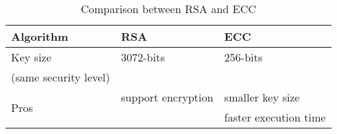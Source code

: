 \begin{table}[h]
     \centering
     \caption[Comparison between RSA and ECC]{Comparison between RSA and ECC}
     \label{table:rsa-ecc}
     \begin{tabular}{lll}
     \toprule[1.1pt]
                   Algorithm   & RSA   & ECC\\
     \midrule[1.1pt]
     \multirow{1}{*}{Key size} & 3072-bits  & 256-bits\\
                 (same security level) & & \\
     \midrule
     \multirow{2}{*}{Pros} & support encryption     & smaller key size\\
                           &      & faster execution time\\
     \bottomrule[1.1pt]
     \end{tabular}
     \end{table}